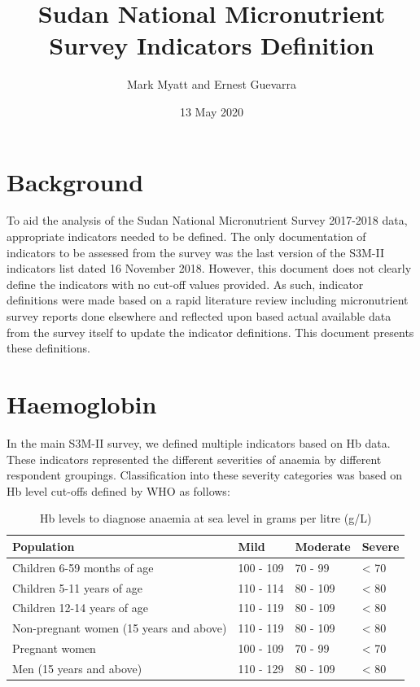 \documentclass[12pt,a4paper]{article}
\title{Sudan National Micronutrient Survey Indicators Definition}
\author{Mark Myatt and Ernest Guevarra}
\date{13 May 2020}
\begin{document}
\maketitle

{
\hypersetup{linkcolor=}
\setcounter{tocdepth}{1}
\tableofcontents
}
\newpage

\hypertarget{background}{%
\section{Background}\label{background}}

To aid the analysis of the Sudan National Micronutrient Survey 2017-2018 data, appropriate indicators needed to be defined. The only documentation of indicators to be assessed from the survey was the last version of the S3M-II indicators list dated 16 November 2018. However, this document does not clearly define the indicators with no cut-off values provided. As such, indicator definitions were made based on a rapid literature review including micronutrient survey reports done elsewhere and reflected upon based actual available data from the survey itself to update the indicator definitions. This document presents these definitions.

\hypertarget{haemoglobin}{%
\section{Haemoglobin}\label{haemoglobin}}

In the main S3M-II survey, we defined multiple indicators based on Hb data. These indicators represented the different severities of anaemia by different respondent groupings. Classification into these severity categories was based on Hb level cut-offs defined by WHO \citep{WorldHealthOrganization:2007tx, WorldHealthOrganization:2011ut} as follows:

\begin{table}[H]

\caption{\label{tab:hb1}Hb levels to diagnose anaemia at sea level in grams per litre (g/L)}
\centering
\begin{tabular}[t]{llll}
\toprule
\textbf{Population} & \textbf{Mild} & \textbf{Moderate} & \textbf{Severe}\\
\midrule
\rowcolor{gray!6}  Children 6-59 months of age & 100 - 109 & 70 - 99 & < 70\\
Children 5-11 years of age & 110 - 114 & 80 - 109 & < 80\\
\rowcolor{gray!6}  Children 12-14 years of age & 110 - 119 & 80 - 109 & < 80\\
Non-pregnant women
(15 years and above) & 110 - 119 & 80 - 109 & < 80\\
\rowcolor{gray!6}  Pregnant women & 100 - 109 & 70 - 99 & < 70\\
\addlinespace
Men
(15 years and above) & 110 - 129 & 80 - 109 & < 80\\
\bottomrule
\end{tabular}
\end{table}
\end{document}
